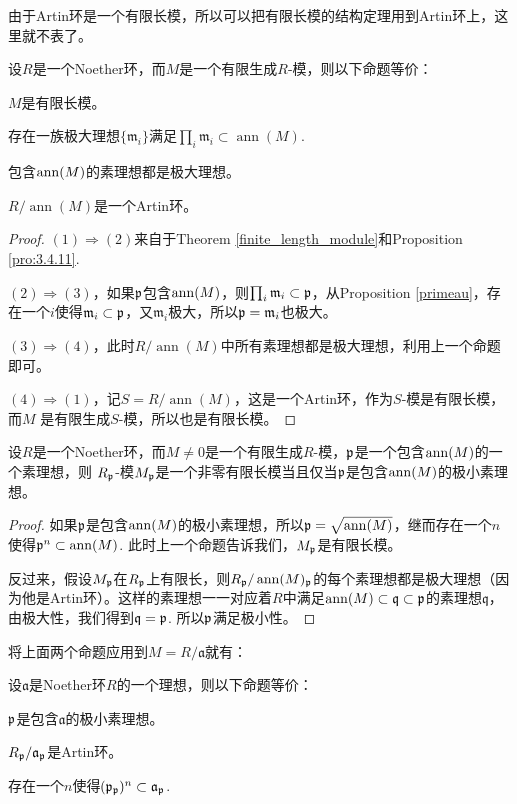 由于Artin环是一个有限长模，所以可以把有限长模的结构定理用到Artin环上，这里就不表了。

\begin{pro}
	设$R$是一个Noether环，而$M$是一个有限生成$R$-模，则以下命题等价：
	\begin{compactenum}[~~(1)]
		\item $M$是有限长模。
		\item 存在一族极大理想$\{\mathfrak m_i\}$满足$\prod_i \mathfrak m_i\subset \operatorname{ann}(M)$.
		\item 包含$\operatorname{ann}(M)$的素理想都是极大理想。
		\item $R/\operatorname{ann}(M)$是一个Artin环。
	\end{compactenum}
\end{pro}

\begin{proof}
	$(1)\Rightarrow (2)$来自于Theorem \ref{finite_length_module}和Proposition \ref{pro:3.4.11}.

	$(2)\Rightarrow (3)$，如果$\mathfrak{p}$包含$\operatorname{ann}(M)$，则$\prod_i \mathfrak m_i\subset \mathfrak{p}$，从Proposition
	\ref{primeau}，存在一个$i$使得$\mathfrak m_i\subset \mathfrak{p}$，又$\mathfrak m_i$极大，所以$\mathfrak{p}=\mathfrak m_i$也极大。

	$(3)\Rightarrow (4)$，此时$R/\operatorname{ann}(M)$中所有素理想都是极大理想，利用上一个命题即可。

	$(4)\Rightarrow (1)$，记$S=R/\operatorname{ann}(M)$，这是一个Artin环，作为$S$-模是有限长模，而$M$
	是有限生成$S$-模，所以也是有限长模。
\end{proof}

\begin{pro}
	设$R$是一个Noether环，而$M\neq 0$是一个有限生成$R$-模，$\mathfrak{p}$是一个包含$\operatorname{ann}(M)$的一个素理想，则
	$R_{\mathfrak{p}}$-模$M_{\mathfrak{p}}$是一个非零有限长模当且仅当$\mathfrak{p}$是包含$\operatorname{ann}(M)$的极小素理想。
\end{pro}

\begin{proof}
	如果$\mathfrak{p}$是包含$\operatorname{ann}(M)$的极小素理想，所以$\mathfrak{p}=\sqrt{\operatorname{ann}(M)}$，继而存在一个$n$使得$\mathfrak{p}^n\subset \operatorname{ann}(M)$. 此时上一个命题告诉我们，$M_{\mathfrak{p}}$是有限长模。

	反过来，假设$M_{\mathfrak{p}}$在$R_{\mathfrak{p}}$上有限长，则$R_{\mathfrak{p}}/\operatorname{ann}(M)_{\mathfrak{p}}$的每个素理想都是极大理想（因为他是Artin环）。这样的素理想一一对应着$R$中满足$\operatorname{ann}(M)\subset \mathfrak q\subset \mathfrak{p}$的素理想$\mathfrak q$，
	由极大性，我们得到$\mathfrak q=\mathfrak{p}$. 所以$\mathfrak{p}$满足极小性。
\end{proof}

将上面两个命题应用到$M=R/\mathfrak a$就有：
\begin{pro}\label{pro:3.4.20}
	设$\mathfrak a$是Noether环$R$的一个理想，则以下命题等价：
	\begin{compactenum}[~~(1)]
		\item $\mathfrak{p}$是包含$\mathfrak a$的极小素理想。
		\item $R_{\mathfrak{p}}/{\mathfrak a}_{\mathfrak{p}}$是Artin环。
		\item 存在一个$n$使得$(\mathfrak{p}_{\mathfrak{p}})^n\subset \mathfrak a_{\mathfrak p}$.
	\end{compactenum}
\end{pro}


